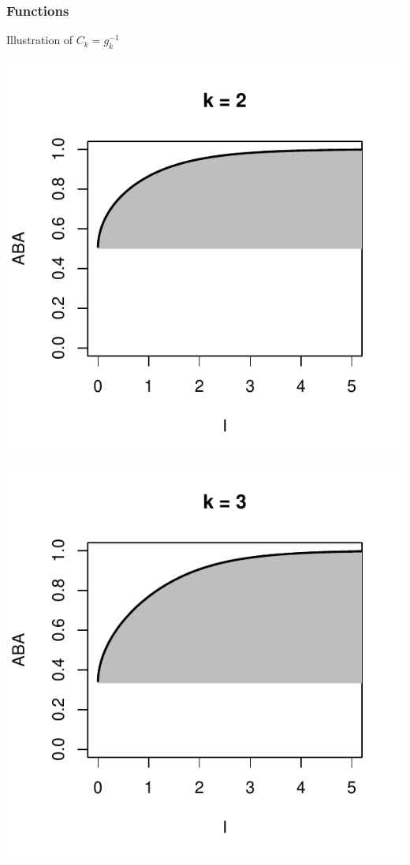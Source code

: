 \documentclass{beamer}
\begin{document}
\begin{frame}
\frametitle{Functions}

Illustration of $C_k = g_k^{-1}$
\begin{center}
\includegraphics[scale = 0.34]{ck_2.pdf}
\includegraphics[scale = 0.34]{ck_3.pdf}

\end{center}
\end{frame}
\end{document}
